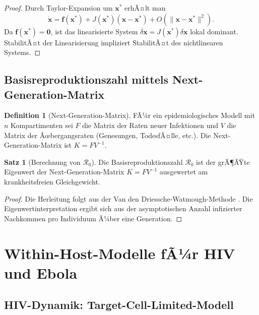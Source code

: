 ﻿\documentclass[a4paper,12pt]{article}
\theoremstyle{definition}
\newtheorem{definition}{Definition}
\newtheorem{satz}{Satz}
\begin{document}
\begin{proof}
Durch Taylor-Expansion um $\mathbf{x}^*$ erhÃ¤lt man
\[
\dot{\mathbf{x}} = \mathbf{f}(\mathbf{x}^*) + J(\mathbf{x}^*)(\mathbf{x} - \mathbf{x}^*) + O(\|\mathbf{x} - \mathbf{x}^*\|^2).
\]
Da $\mathbf{f}(\mathbf{x}^*) = \mathbf{0}$, ist das linearisierte System $\dot{\delta\mathbf{x}} = J(\mathbf{x}^*) \delta\mathbf{x}$ lokal dominant. StabilitÃ¤t der Linearisierung impliziert StabilitÃ¤t des nichtlinearen Systems.
\end{proof}

\subsection{Basisreproduktionszahl mittels Next-Generation-Matrix}

\begin{definition}[Next-Generation-Matrix]
FÃ¼r ein epidemiologisches Modell mit $n$ Kompartimenten sei $F$ die Matrix der Raten neuer Infektionen und $V$ die Matrix der Ãœbergangsraten (Genesungen, TodesfÃ¤lle, etc.). Die Next-Generation-Matrix ist $K = FV^{-1}$.
\end{definition}

\begin{satz}[Berechnung von $\mathcal{R}_0$]
Die Basisreproduktionszahl $\mathcal{R}_0$ ist der grÃ¶ÃŸte Eigenwert der Next-Generation-Matrix $K = FV^{-1}$ ausgewertet am krankheitsfreien Gleichgewicht.
\end{satz}

\begin{proof}
Die Herleitung folgt aus der Van den Driessche-Watmough-Methode \cite{diekmann2010understanding}. Die Eigenwertinterpretation ergibt sich aus der asymptotischen Anzahl infizierter Nachkommen pro Individuum Ã¼ber eine Generation.
\end{proof}

\section{Within-Host-Modelle fÃ¼r HIV und Ebola}

\subsection{HIV-Dynamik: Target-Cell-Limited-Modell}
\end{document}
